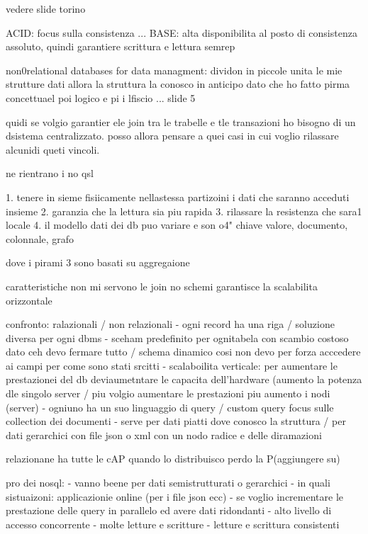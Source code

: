 vedere slide torino

ACID: focus sulla consistenza ...
BASE: alta disponibilita al posto di consistenza assoluto, quindi garantiere scrittura e lettura semrep








non0relational databases for data managment:
dividon in piccole unita le mie strutture dati allora la struttura la conosco in anticipo dato che ho fatto pirma concettuael poi logico e pi i lfiscio 
... slide 5


quidi se volgio garantier ele join tra le trabelle e tle transazioni ho bisogno di un dsistema centralizzato. posso allora pensare a quei casi in cui voglio rilassare alcunidi queti vincoli.

ne rientrano i no qsl

1. tenere in sieme fisiicamente nellastessa partizoini i dati che saranno acceduti insieme
2. garanzia che la lettura sia piu rapida
3. rilassare la resistenza che sara1 locale 
4. il modello dati  dei db puo variare e son o4" chiave valore, documento, colonnale, grafo

dove i pirami 3 sono basati su aggregaione


caratteristiche\;
non mi servono le join
no schemi
garantisce la scalabilita orizzontale


confronto:
ralazionali / non relazionali
- ogni record ha una riga / soluzione diversa per ogni dbms
- sceham predefinito per ognitabela con scambio costoso dato ceh devo fermare tutto / schema dinamico cosi non devo per forza acccedere ai campi per come sono stati srcitti
- scalaboilita verticale: per aumentare le prestazionei del db deviaumetntare le capacita dell'hardware (aumento la potenza dle singolo server / piu volgio aumentare le prestazioni piu aumento i nodi (server) 
- ogniuno ha un suo linguaggio di query / custom query focus sulle collection dei documenti
- serve per dati piatti dove conosco la struttura / per dati gerarchici con file json o xml con un nodo radice e delle diramazioni


relazionane ha tutte le cAP quando lo distribuisco perdo la P(aggiungere su)


pro dei nosql:
- vanno beene per dati semistrutturati o gerarchici
- in quali sistuaizoni: applicazionie online (per i file json ecc)
- se voglio incrementare le prestazione delle query in parallelo ed avere dati ridondanti
- alto livello di accesso concorrente
- molte letture e scritture
- letture e scrittura consistenti


